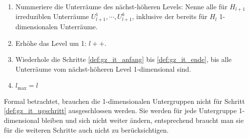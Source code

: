 \begin{definition}
\begin{enumerate}[label={\arabic*.)}]
		\item Nummeriere die Unterräume des nächst-höheren Levels: Nenne alle für $H_{l+1}$ irreduziblen Unterräume $U_{l+1}^{1}, \cdots, U_{l+1}^{k}$, inklusive der bereits für $H_l$ 1-dimensionalen Unterräume.
		\item Erhöhe das Level um 1: $l++$. \label{def:gz_it_ende}
		\item Wiederhole die Schritte \ref{def:gz_it_anfang} bis \ref{def:gz_it_ende}, bis alle Unterräume vom nächst-höheren Level 1-dimensional sind.
		\item $l_{\text{max}} = l$
		\end{enumerate}
\end{definition}
\begin{remark}
	Formal betrachtet, brauchen die 1-dimensionalen Untergruppen nicht für Schritt \ref{def:gz_it_ugschritt} ausgeschlossen werden. Sie werden für jede Untergruppe 1-dimensional bleiben und sich nicht weiter ändern, entsprechend braucht man sie für die weiteren Schritte auch nicht zu berücksichtigen.
\end{remark}
